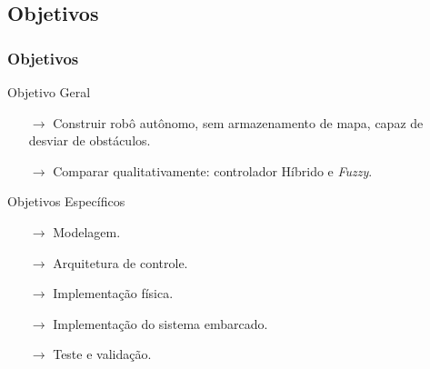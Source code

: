 \subsection{Objetivos}
\begin{frame}
	\frametitle{Objetivos}
	\begin{exampleblock}{Objetivo Geral}
		\begin{itemize}
		  \item[$\rightarrow$] Construir robô autônomo, sem armazenamento de mapa,
		  capaz de desviar de obstáculos.
		  \item[$\rightarrow$] Comparar qualitativamente: controlador Híbrido e
		  \textit{Fuzzy}.
		\end{itemize}
	\end{exampleblock}
	\pause
	\begin{block}{Objetivos Específicos}
		\begin{itemize}
		  \item[$\rightarrow$] Modelagem.
		  \item[$\rightarrow$] Arquitetura de controle.
		  \item[$\rightarrow$] Implementação física.
		  \item[$\rightarrow$] Implementação do sistema embarcado.
		  \item[$\rightarrow$] Teste e validação.
		\end{itemize}
	\end{block}
\end{frame}